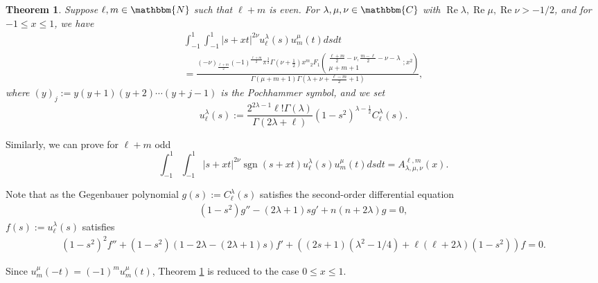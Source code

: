 \documentclass[12pt]{article}
\numberwithin{equation}{section}
\newcommand{\assign}{:=}
\newcommand{\tmop}[1]{\ensuremath{\operatorname{#1}}}
\newtheorem{theorem}[corollary]{Theorem}
\begin{document}
\begin{theorem}
  \label{main-thm}Suppose $\ell, m \in \mathbbm{N}$ such that $\ell + m$ is
  even. For $\lambda, \mu, \nu \in \mathbbm{C}$ with $\tmop{Re} \lambda,
  \tmop{Re} \mu, \tmop{Re} \nu > - 1 / 2$, and for $- 1 \leqslant x \leqslant
  1$, we have
  \begin{multline}
     \displaystyle\int_{- 1}^1 \displaystyle\int_{- 1}^1 | s + xt |^{2 \nu} u_{\ell}^{\lambda} (s)
    u_m^{\mu} (t) d s d t   \\
     \displaystyle= \frac{(- \nu)_{\frac{\ell + m}{2}} (- 1)^{\frac{\ell + m}{2}}
    \pi^{\frac{3}{2}} \Gamma \left( \nu + \frac{1}{2} \right) x^m{}_2 F_1
    \left( \begin{array}{c}
      \frac{\ell + m}{2} - \nu, \frac{m - \ell}{2} - \nu - \lambda\\
      \mu + m + 1
    \end{array} ; x^2 \right)}{\Gamma (\mu + m + 1) \Gamma \left( \lambda +
    \nu + \frac{\ell - m}{2} + 1 \right)},  \label{eqn:main}  
  \end{multline}
  where $(y)_j \assign y (y + 1) (y + 2) \cdots (y + j - 1)$ is the Pochhammer 
  symbol, and we set
\[ u_{\ell}^{\lambda} (s) \assign \frac{2^{2 \lambda - 1} \ell ! \Gamma
   (\lambda)}{\Gamma (2 \lambda + \ell)} (1 - s^2)^{\lambda - \frac{1}{2}}
   C_{\ell}^{\lambda} (s) . \]
\end{theorem}
\begin{remark}
	Similarly, we can prove for $\ell+m$ odd
	\begin{equation*}
		\displaystyle\int_{- 1}^1 \displaystyle\int_{- 1}^1 | s + xt |^{2 \nu}\operatorname{sgn}\left( s+xt \right) u_{\ell}^{\lambda} (s)
		u_m^{\mu} (t) d s d t=A^{\ell,m}_{\lambda,\mu,\nu}(x).
	\end{equation*}
\end{remark}

Note that as the Gegenbauer polynomial $g (s) \assign C_{\ell}^{\lambda} (s)$
satisfies the second-order differential equation
\begin{eqnarray}
  & (1 - s^2) g'' - (2 \lambda + 1) s g' + n (n + 2 \lambda) g = 0, & 
  \nonumber
\end{eqnarray}
$f (s) \assign u_{\ell}^{\lambda} (s)$ satisfies
\begin{eqnarray}
  & (1 - s^2)^2 f'' + (1 - s^2) (1 - 2 \lambda - (2 \lambda + 1) s) f' + ((2
  s + 1) (\lambda^2 - 1 / 4) + \ell (\ell + 2 \lambda) (1 - s^2)) f = 0. & 
  \nonumber
\end{eqnarray}
\begin{remark}
  Since $u_m^{\mu} (- t) = (- 1)^m u_m^{\mu} (t)$, Theorem \ref{main-thm} is
  reduced to the case $0 \leqslant x \leqslant 1$.
\end{remark}
\end{document}
